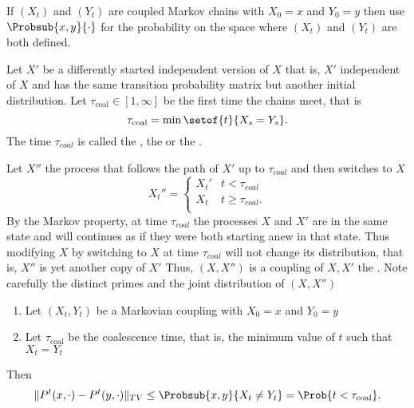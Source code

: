 \documentclass[12pt]{article}
\begin{document}
If \( (X_t) \) and \( (Y_t) \) are coupled Markov chains with \( X_0 = x
\) and \( Y_0 = y \) then use \( \Probsub{x,y}{\cdot} \) for the
probability on the space where \( (X_t) \) and \( (Y_t) \) are both
defined.

\begin{definition}
    Let \( X' \) be a differently started independent version of \( X \)
    that is, \( X' \) independent of \( X \) and has the same transition
    probability matrix but another initial distribution.  Let \( \tau_{\text
    {coal}} \in [1, \infty] \) be the first time the chains meet, that
    is
    \[
        \tau_{\text{coal}} = \min \setof{t}{X_s = Y_s}.
    \] The time \( \tau_{coal} \) is called the ,
    the  or the .
\end{definition}

\begin{definition}
    Let \( X'' \) the process that follows the path of \( X' \) up to \(
    \tau_ {coal} \) and then switches to \( X \)
    \[
        X_t'' =
        \begin{cases}
            X_t' & t < \tau_{coal} \\
            X_t & t \ge \tau_{coal}.  \\
        \end{cases}
    \] By the Markov property, at time \( \tau_{coal} \) the processes \(
    X \) and \( X' \) are in the same state and will continues as if
    they were both starting anew in that state.  Thus modifying \( X \)
    by switching to \( X \) at time \( \tau_{coal} \) will not change
    its distribution, that is, \( X'' \) is yet another copy of \( X' \)
    Thus, \( (X,X'') \) is a coupling of \( X, X' \) the .  Note carefully the distinct primes and the joint
    distribution of \( (X,X'') \)
\end{definition}

\begin{theorem}
    \begin{enumerate}
        \item
            Let \( (X_t, Y_t) \) be a Markovian coupling with \( X_0 = x
            \) and \( Y_0 = y \)
        \item
            Let \( \tau_{\text{coal}} \) be the coalescence time, that
            is, the minimum value of \( t \) such that \( X_t = Y_t \)
    \end{enumerate}
    Then
    \[
        \| P^t(x,\cdot) - P^t(y,\cdot)\|_{TV} \le \Probsub{x,y}{X_t \ne
        Y_t} = \Prob{t < \tau_{\text{coal}}}.
    \]
\end{theorem}
\end{document}
